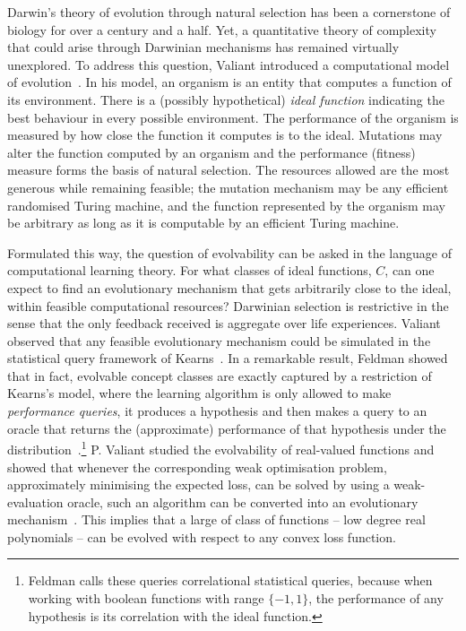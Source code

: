 Darwin's theory of evolution through natural selection has been a cornerstone of
biology for over a century and a half. Yet, a quantitative theory of complexity
that could arise through Darwinian mechanisms has remained virtually unexplored.
To address this question, Valiant introduced a computational model of
evolution~\cite{Valiant:2009-evolvability}.  In his model, an organism is an
entity that computes a function of its environment.  There is a (possibly
hypothetical) \emph{ideal function} indicating the best behaviour in every
possible environment. The performance of the organism is measured by how close
the function it computes is to the ideal. Mutations may alter the function
computed by an organism and the performance (fitness) measure forms the basis of
natural selection. The resources allowed are the most generous while remaining
feasible; the mutation mechanism may be any efficient randomised Turing machine,
and the function represented by the organism may be arbitrary as long as it is
computable by an efficient Turing machine.

Formulated this way, the question of evolvability can be asked in the language
of computational learning theory. For what classes of ideal functions, $C$, can
one expect to find an evolutionary mechanism that gets arbitrarily close to the
ideal, within feasible computational resources? Darwinian selection is
restrictive in the sense that the only feedback received is aggregate over life
experiences. Valiant observed that any feasible evolutionary mechanism could be
simulated in the statistical query framework of Kearns~\cite{Kearns:1998}. In a
remarkable result, Feldman showed that in fact, evolvable concept classes are
exactly captured by a restriction of Kearns's model, where the learning
algorithm is only allowed to make \emph{performance queries}, \ie it produces a
hypothesis and then makes a query to an oracle that returns the (approximate)
performance of that hypothesis under the
distribution~\cite{Feldman:2008-evolvability}.\footnote{Feldman calls these
queries correlational statistical queries, because when working with boolean
functions with range $\{-1, 1\}$, the performance of any hypothesis is its
correlation with the ideal function.} P.  Valiant studied the evolvability of
real-valued functions and showed that whenever the corresponding weak
optimisation problem, \ie approximately minimising the expected loss, can be
solved by using a weak-evaluation oracle, such an algorithm can be converted
into an evolutionary mechanism~\cite{Valiant:2012-real}. This implies that a
large of class of functions -- low degree real polynomials -- can be evolved
with respect to any convex loss function.


